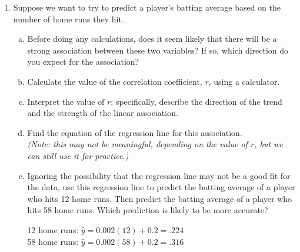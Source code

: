 \begin{enumerate}
\item Suppose we want to try to predict a player's batting average based on the number of home runs they hit.
\begin{enumerate}[(a)]
\item Before doing any calculations, does it seem likely that there will be a strong association between these two variables?  If so, which direction do you expect for the association? 
\item Calculate the value of the correlation coefficient, $r$, using a calculator. 
\item Interpret the value of $r$; specifically, describe the direction of the trend and the strength of the linear association. 
\item Find the equation of the regression line for this association.\\
\emph{(Note: this may not be meaningful, depending on the value of $r$, but we can still use it for practice.)} 
\item Ignoring the possibility that the regression line may not be a good fit for the data, use this regression line to predict the batting average of a player who hits 12 home runs.  Then predict the batting average of a player who hits 58 home runs.  Which prediction is likely to be more accurate? 
\begin{center}
12 home runs: $\hat{y} = 0.002(12) + 0.2 = .224$\\
58 home runs: $\hat{y} = 0.002(58) + 0.2 = .316$
\end{center}
\end{enumerate}


\end{enumerate}
